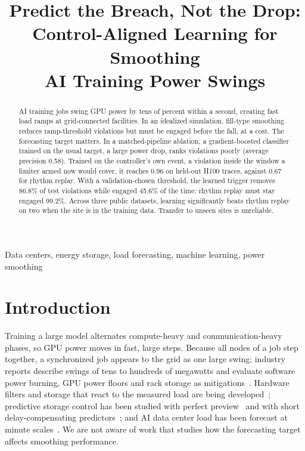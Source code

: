 \documentclass[conference]{IEEEtran}
\begin{document}
\title{Predict the Breach, Not the Drop:\\Control-Aligned Learning for Smoothing\\AI Training Power Swings}

\author{
}

\maketitle

\begin{abstract}
AI training jobs swing GPU power by tens of percent within a second, creating fast load ramps at
grid-connected facilities. In an idealized simulation, fill-type smoothing reduces ramp-threshold
violations but must be engaged before the fall, at a cost. The forecasting target matters. In a
matched-pipeline ablation, a gradient-boosted classifier trained on the usual target, a large power drop,
ranks violations poorly (average precision 0.58). Trained on the controller's own event,
a violation inside the window a limiter armed now would cover, it reaches 0.96 on
held-out H100 traces, against 0.67 for rhythm replay. With a validation-chosen threshold, the
learned trigger removes 86.8\% of test violations while engaged
45.6\% of the time; rhythm replay must stay engaged 99.2\%.
Across three public datasets, learning significantly beats rhythm replay on two when the site is in the
training data. Transfer to unseen sites is unreliable.
\end{abstract}

\begin{IEEEkeywords}
Data centers, energy storage, load forecasting, machine learning, power smoothing
\end{IEEEkeywords}

\section{Introduction}
Training a large model alternates compute-heavy and communication-heavy phases, so GPU power moves in
fast, large steps. Because all nodes of a job step together, a synchronized job appears to the grid as
one large swing; industry reports describe swings of tens to hundreds of megawatts and evaluate software
power burning, GPU power floors and rack storage as mitigations~\cite{msft_stab}. Hardware filters and
storage that react to the measured load are being developed~\cite{easyrider,activefilter}; predictive
storage control has been studied with perfect preview~\cite{hessdpc} and with short delay-compensating
predictors~\cite{lyu}; and AI data center load has been forecast at minute scales~\cite{mughees}. We are
not aware of work that studies how the forecasting target affects smoothing performance.
\end{document}
